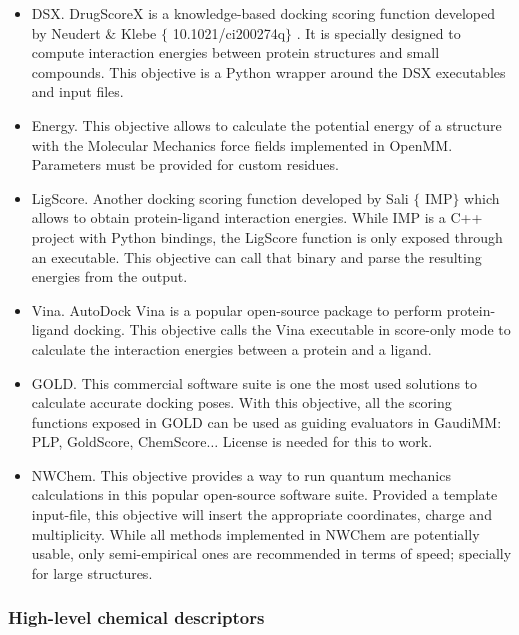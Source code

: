 \begin{itemize}
	\item DSX. DrugScoreX is a knowledge-based docking scoring function developed by Neudert $\&$  Klebe $ \{ $ 10.1021/ci200274q$ \} $ . It is specially designed to compute interaction energies between protein structures and small compounds. This objective is a Python wrapper around the DSX executables and input files.

	\item Energy. This objective allows to calculate the potential energy of a structure with the Molecular Mechanics force fields implemented in OpenMM. Parameters must be provided for custom residues.

	\item LigScore. Another docking scoring function developed by Sali $ \{ $ IMP$ \} $  which allows to obtain protein-ligand interaction energies. While IMP is a C++ project with Python bindings, the LigScore function is only exposed through an executable. This objective can call that binary and parse the resulting energies from the output.

	\item Vina. AutoDock Vina is a popular open-source package to perform protein-ligand docking. This objective calls the Vina executable in score-only mode to calculate the interaction energies between a protein and a ligand.

	\item GOLD. This commercial software suite is one the most used solutions to calculate accurate docking poses. With this objective, all the scoring functions exposed in GOLD can be used as guiding evaluators in GaudiMM: PLP, GoldScore, ChemScore$ \ldots $  License is needed for this to work.

	\item NWChem. This objective provides a way to run quantum mechanics calculations in this popular open-source software suite. Provided a template input-file, this objective will insert the appropriate coordinates, charge and multiplicity. While all methods implemented in NWChem are potentially usable, only semi-empirical ones are recommended in terms of speed; specially for large structures.


\end{itemize}\subsubsection{High-level chemical descriptors}
